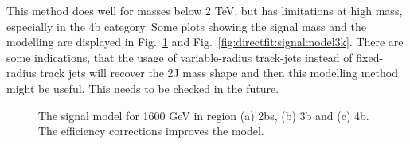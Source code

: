 This method does well for masses below 2 TeV, but has limitations at high mass, especially in the 4b category. Some plots showing the signal mass and the modelling are displayed in Fig.~\ref{fig:directfit:signalmodel} and Fig.~\ref{fig:directfit:signalmodel3k}. There are some indications, that the usage of variable-radius track-jets instead of fixed-radius track jets will recover the 2J mass shape and then this modelling method might be useful. This needs to be checked in the future.

\begin{figure}[htbp!]
\begin{center}
\caption{The signal model for 1600 GeV in region (a) 2bs, (b) 3b and (c) 4b. The efficiency corrections improves the model.}
\label{fig:directfit:signalmodel}
\end{center}
\end{figure}

